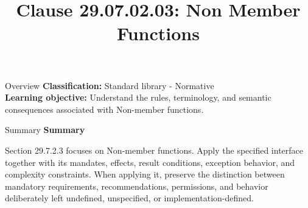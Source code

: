 \documentclass[10pt,letterpaper]{article}
\title{Clause 29.07.02.03: Non Member Functions}
\author{}
\date{}
\begin{document}
\maketitle
\begin{CornellOverviewBox}{Overview}
\textbf{Classification:} Standard library - Normative\\[2pt]
\textbf{Learning objective:} Understand the rules, terminology, and semantic consequences associated with Non-member functions.
\end{CornellOverviewBox}\begin{CornellSummaryBox}{Summary}
{\sffamily\bfseries\color{Accent} Summary}\par\vspace{3pt}Section 29.7.2.3 focuses on Non-member functions. Apply the specified interface together with its mandates, effects, result conditions, exception behavior, and complexity constraints. When applying it, preserve the distinction between mandatory requirements, recommendations, permissions, and behavior deliberately left undefined, unspecified, or implementation-defined.
\end{CornellSummaryBox}
\end{document}

